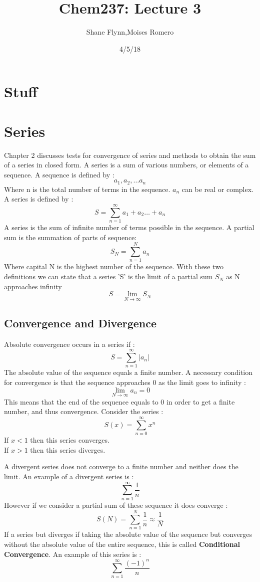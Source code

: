 \documentclass{article}
\title{Chem237: Lecture 3}
\date{4/5/18}
\author{Shane Flynn,Moises Romero}
\newcommand{\be}{\begin{equation}}
\newcommand{\ee}{\end{equation}}
\begin{document}
\maketitle
\section*{Stuff}
\section*{Series}
 Chapter 2 discusses tests for convergence of series and methods to obtain the sum of a series in closed form.
 A series is a sum of various numbers, or elements of a sequence. A sequence is defined by :
 \be
  a_1, a_2, \hdots a_n
 \ee
 Where n is the total number of terms in the sequence.
 $a_n$ can be real or complex.
A series is defined by :
\be
S=\sum_{n=1}^{\infty}a_1 + a_2 \hdots + a_n
\ee
A series is the sum of infinite number of terms possible in the sequence.
A partial sum is the summation of parts of sequence:
\be
S_N = \sum_{n=1}^{N} a_n
\ee
Where capital N is the highest number of the sequence.
With these two definitions we can state that a series 'S' is the limit of a partial sum $S_N$ as N approaches infinity
\be
S = \lim_{N \to \infty}{S_N}
\ee
\subsection*{Convergence and Divergence}
Absolute convergence occurs in a series if :
\be
S= \sum_{n=1}^{\infty} |a_n|
\ee
The absolute value of the sequence equals a finite number.
A necessary condition for convergence is that the sequence approaches 0 as the limit goes to infinity :
\be
\lim_{N \to \infty} a_n = 0
\ee
This means that the end of the sequence equals to 0 in order to get a finite number, and thus convergence.
\bigskip
Consider the series :
\be
S(x) = \sum_{n=0}^\infty x^n
\ee
If $x<1$ then this series converges. \\
If $x>1$ then this series diverges.

A divergent series does not converge to a finite number and neither does the limit.
An example of a divergent series is :
\be
\sum_{n=1}^{\infty} \frac{1}{n}
\ee
However if we consider a partial sum of these sequence it does converge :
\be
S(N) = \sum_{n=1}^{N} \frac{1}{n} \approx \frac{1}{N}
\ee
If a series but diverges if taking the absolute value of the sequence but converges without the absolute value of the entire sequence, this is called \textbf{Conditional Convergence}.
An example of this series is :
\be
\sum_{n=1}^{\infty}\frac{(-1)^n}{n}
\ee
\end{document}
